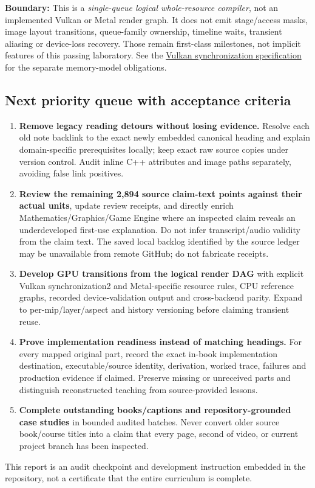 \textbf{Boundary:} This is a \emph{single-queue logical whole-resource compiler}, not an implemented Vulkan or Metal render graph. It does not emit stage/access masks, image layout transitions, queue-family ownership, timeline waits, transient aliasing or device-loss recovery. Those remain first-class milestones, not implicit features of this passing laboratory. See the \href{https://docs.vulkan.org/spec/latest/chapters/synchronization.html}{Vulkan synchronization specification} for the separate memory-model obligations.

\subsection{Next priority queue with acceptance criteria}\label{appendix-28e6f216fdc7-next-priority-queue-with-acceptance-criteria}

\begin{enumerate}
\def\labelenumi{\arabic{enumi}.}
\tightlist
\item
  \textbf{Remove legacy reading detours without losing evidence.} Resolve each old note backlink to the exact newly embedded canonical heading and explain domain-specific prerequisites locally; keep exact raw source copies under version control. Audit inline C++ attributes and image paths separately, avoiding false link positives.
\item
  \textbf{Review the remaining 2,894 source claim-text points against their actual units}, update review receipts, and directly enrich Mathematics/Graphics/Game Engine where an inspected claim reveals an underdeveloped first-use explanation. Do not infer transcript/audio validity from the claim text. The saved local backlog identified by the source ledger may be unavailable from remote GitHub; do not fabricate receipts.
\item
  \textbf{Develop GPU transitions from the logical render DAG} with explicit Vulkan synchronization2 and Metal-specific resource rules, CPU reference graphs, recorded device-validation output and cross-backend parity. Expand to per-mip/layer/aspect and history versioning before claiming transient reuse.
\item
  \textbf{Prove implementation readiness instead of matching headings.} For every mapped original part, record the exact in-book implementation destination, executable/source identity, derivation, worked trace, failures and production evidence if claimed. Preserve missing or unreceived parts and distinguish reconstructed teaching from source-provided lessons.
\item
  \textbf{Complete outstanding books/captions and repository-grounded case studies} in bounded audited batches. Never convert older source book/course titles into a claim that every page, second of video, or current project branch has been inspected.
\end{enumerate}

This report is an audit checkpoint and development instruction embedded in the repository, not a certificate that the entire curriculum is complete.
